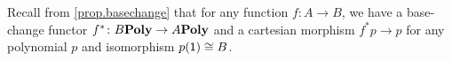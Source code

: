 \documentclass[DynamicalBook]{subfiles}
\begin{document}




Recall from \cref{prop.basechange} that for any function $f\colon A\to B$, we have a base-change functor $f^*\colon B\textbf{Poly}\to A\textbf{Poly}$ and a cartesian morphism $f^*p\to p$ for any polynomial $p$ and isomorphism $p(\textsf{1})\cong B$.
\end{document}
